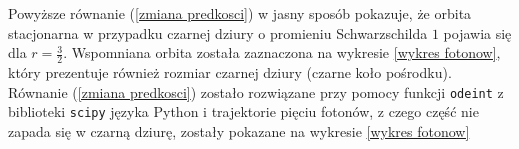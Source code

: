 Powyższe równanie (\ref{zmiana predkosci}) w jasny sposób pokazuje, że orbita stacjonarna w przypadku czarnej dziury o promieniu Schwarzschilda $1$ pojawia się dla $r=\frac{3}{2}$. Wspomniana orbita została zaznaczona na wykresie \ref{wykres fotonow}, który prezentuje również rozmiar czarnej dziury (czarne koło pośrodku). Równanie (\ref{zmiana predkosci}) zostało rozwiązane przy pomocy funkcji \verb+odeint+ z biblioteki \verb+scipy+ języka Python i trajektorie pięciu fotonów, z czego część nie zapada się w czarną dziurę, zostały pokazane na wykresie \ref{wykres fotonow}





%
%
%
%
